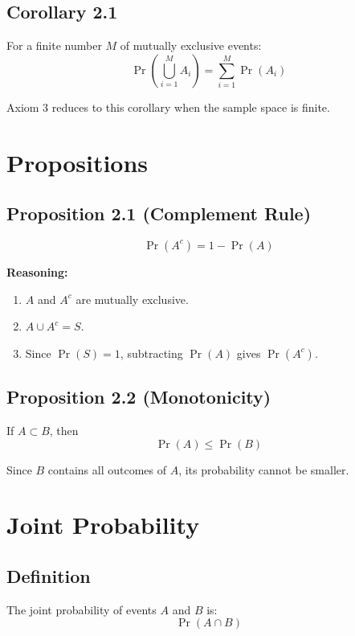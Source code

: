 \documentclass[12pt,a4paper]{article}
\begin{document}
\subsection{Corollary 2.1}

For a finite number $M$ of mutually exclusive events:
\[
\Pr\left(\bigcup_{i=1}^{M} A_i\right)
=
\sum_{i=1}^{M} \Pr(A_i)
\]

Axiom 3 reduces to this corollary when the sample space is finite.

\section{Propositions}

\subsection{Proposition 2.1 (Complement Rule)}

\[
\Pr(A^c) = 1 - \Pr(A)
\]

\textbf{Reasoning:}
\begin{enumerate}
    \item $A$ and $A^c$ are mutually exclusive.
    \item $A \cup A^c = S$.
    \item Since $\Pr(S) = 1$, subtracting $\Pr(A)$ gives $\Pr(A^c)$.
\end{enumerate}

\subsection{Proposition 2.2 (Monotonicity)}

If $A \subset B$, then
\[
\Pr(A) \leq \Pr(B)
\]

Since $B$ contains all outcomes of $A$, its probability cannot be smaller.

\section{Joint Probability}

\subsection{Definition}

The joint probability of events $A$ and $B$ is:
\[
\Pr(A \cap B)
\]
\end{document}
